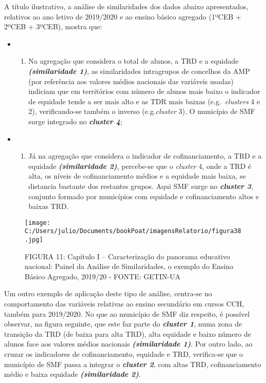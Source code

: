 \documentclass[
]{book}
\providecommand{\tightlist}{%
  \setlength{\itemsep}{0pt}\setlength{\parskip}{0pt}}
\begin{document}
A título ilustrativo, a análise de similaridades dos dados abaixo apresentados, relativos ao ano letivo de 2019/2020 e ao ensino básico agregado (1ºCEB + 2ºCEB + 3ºCEB), mostra que:

\begin{itemize}
\item
  \begin{enumerate}
  \def\labelenumi{\roman{enumi})}
  \tightlist
  \item
    Na agregação que considera o total de alunos, a TRD e a equidade \textbf{\emph{(similaridade 1)}}, as similaridades intragrupos de concelhos da AMP (por referência aos valores médios nacionais das variáveis usadas) indiciam que em territórios com número de alunos mais baixo o indicador de equidade tende a ser mais alto e as TDR mais baixas (e.g.~\emph{clusters} 4 e 2), verificando-se também o inverso (e.g.\emph{cluster} 3). O município de SMF surge integrado no \textbf{\emph{cluster 4}};
  \end{enumerate}
\item
  \begin{enumerate}
  \def\labelenumi{\roman{enumi})}
  \setcounter{enumi}{1}
  \tightlist
  \item
    Já na agregação que considera o indicador de cofinanciamento, a TRD e a equidade \textbf{\emph{(similaridade 2)}}, percebe-se que o \emph{cluster} 4, onde a TRD é alta, os níveis de cofinanciamento médios e a equidade mais baixa, se distancia bastante dos restantes grupos. Aqui SMF surge no \textbf{\emph{cluster 3}}, conjunto formado por municípios com equidade e cofinanciamento altos e baixas TRD.
  \end{enumerate}
\end{itemize}

\begin{figure}
\centering
\texttt{[image: C:/Users/julio/Documents/bookPoat/imagensRelatorio/figura38.jpg]}
\caption{FIGURA 11: Capítulo I -- Caracterização do panorama educativo nacional: Painel da Análise de Similaridades, o exemplo do Ensino Básico Agregado, 2019/20 - FONTE: GETIN-UA}
\end{figure}

Um outro exemplo de aplicação deste tipo de análise, centra-se no comportamento das variáveis relativas ao ensino secundário em cursos CCH, também para 2019/2020. No que ao município de SMF diz respeito, é possível observar, na figura seguinte, que este faz parte do \textbf{\emph{cluster 1}}, numa zona de transição da TRD (de baixa para alta TRD), alta equidade e baixo número de alunos face aos valores médios nacionais \textbf{\emph{(similaridade 1)}}. Por outro lado, ao cruzar os indicadores de cofinanciamento, equidade e TRD, verifica-se que o município de SMF passa a integrar o \textbf{\emph{cluster 2}}, com altas TRD, cofinanciamento médio e baixa equidade \textbf{\emph{(similaridade 2)}}.
\end{document}
